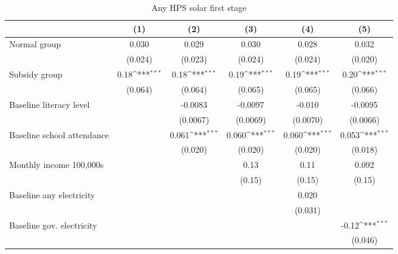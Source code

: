 \begin{table}[htbp]\centering
\def\sym#1{\ifmmode^{#1}\else\(^{#1}\)\fi}
\caption{Any HPS solar first stage}
\begin{tabular*}{1\hsize}{@{\hskip\tabcolsep\extracolsep\fill}l*{5}{c}}
\toprule
                &\multicolumn{1}{c}{(1)}         &\multicolumn{1}{c}{(2)}         &\multicolumn{1}{c}{(3)}         &\multicolumn{1}{c}{(4)}         &\multicolumn{1}{c}{(5)}         \\
\midrule
Normal group    &    0.030         &    0.029         &    0.030         &    0.028         &    0.032         \\
                &  (0.024)         &  (0.023)         &  (0.024)         &  (0.024)         &  (0.020)         \\
Subsidy group   &     0.18\sym{***}&     0.18\sym{***}&     0.19\sym{***}&     0.19\sym{***}&     0.20\sym{***}\\
                &  (0.064)         &  (0.064)         &  (0.065)         &  (0.065)         &  (0.066)         \\
Baseline literacy level&                  &  -0.0083         &  -0.0097         &   -0.010         &  -0.0095         \\
                &                  & (0.0067)         & (0.0069)         & (0.0070)         & (0.0066)         \\
Baseline school attendance&                  &    0.061\sym{***}&    0.060\sym{***}&    0.060\sym{***}&    0.053\sym{***}\\
                &                  &  (0.020)         &  (0.020)         &  (0.020)         &  (0.018)         \\
Monthly income 100,000s&                  &                  &     0.13         &     0.11         &    0.092         \\
                &                  &                  &   (0.15)         &   (0.15)         &   (0.15)         \\
Baseline any electricity&                  &                  &                  &    0.020         &                  \\
                &                  &                  &                  &  (0.031)         &                  \\
Baseline gov. electricity&                  &                  &                  &                  &    -0.12\sym{***}\\
                &                  &                  &                  &                  &  (0.046)         \\

\end{tabular*}
\end{table}
